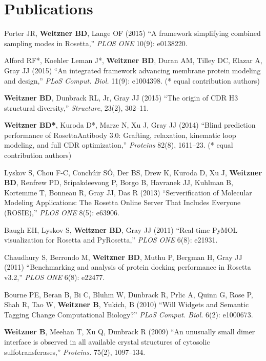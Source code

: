 \documentclass[12pt]{article}
\newcommand{\allcapsspacing}[1]{{\addfontfeature{LetterSpace=7.5}#1}}
\begin{document}
\section*{\allcapsspacing{Publications}}
\begin{etaremune}
\item Porter JR, \textbf{Weitzner BD}, Lange OF (2015) ``A framework simplifying combined sampling modes in Rosetta,'' \textit{PLOS ONE} 10(9): e0138220.
\item Alford RF*, Koehler Leman J*, \textbf{Weitzner BD}, Duran AM, Tilley DC, Elazar A, Gray JJ (2015) ``An integrated framework advancing membrane protein modeling and design,'' \textit{PLoS Comput. Biol.} 11(9): e1004398. (* equal contribution authors)
\item \textbf{Weitzner BD}, Dunbrack RL, Jr, Gray JJ (2015) ``The origin of CDR H3 structural diversity,'' \textit{Structure}, 23(2), 302--11.
\item \textbf{Weitzner BD*}, Kuroda D*, Marze N, Xu J, Gray JJ (2014) ``Blind prediction performance of RosettaAntibody 3.0: Grafting, relaxation, kinematic loop modeling, and full CDR optimization,'' \textit{Proteins} 82(8), 1611--23. (* equal contribution authors)
\item Lyskov S, Chou F-C, Conch{\'u}ir S{\'O}, Der BS, Drew K, Kuroda D, Xu J, \textbf{Weitzner BD}, Renfrew PD, Sripakdeevong P, Borgo B, Havranek JJ, Kuhlman B, Kortemme T, Bonneau R, Gray JJ, Das R (2013) ``Serverification of Molecular Modeling Applications: The Rosetta Online Server That Includes Everyone (ROSIE),'' \textit{PLOS ONE} 8(5): e63906.
\item Baugh EH, Lyskov S, \textbf{Weitzner BD}, Gray JJ (2011) ``Real-time PyMOL visualization for Rosetta and PyRosetta,'' \textit{PLOS ONE} 6(8): e21931.
\item Chaudhury S, Berrondo M, \textbf{Weitzner BD}, Muthu P, Bergman H, Gray JJ (2011) ``Benchmarking and analysis of protein docking performance in Rosetta v3.2,'' \textit{PLOS ONE} 6(8): e22477.
\item Bourne PE, Beran B, Bi C, Bluhm W, Dunbrack R, Prlic A, Quinn G, Rose P, Shah R, Tao W, \textbf{Weitzner B}, Yukich, B (2010) ``Will Widgets and Semantic Tagging Change Computational Biology?'' \textit{PLoS Comput. Biol.} 6(2): e1000673.
\item \textbf{Weitzner B}, Meehan T, Xu Q, Dunbrack R (2009) ``An unusually small dimer interface is observed in all available crystal structures of cytosolic sulfotransferases,'' \textit{Proteins.} 75(2), 1097--134.
\end{etaremune}
\end{document}
